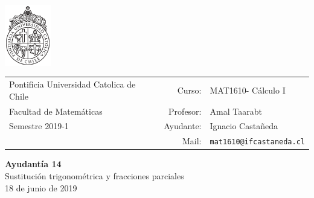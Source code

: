 \documentclass[12pt]{article}
\makeatletter
\newcommand{\ayudantia}{{\sc Ayudantía 14}}
\newcommand{\tituloayu}{Sustitución trigonométrica y fracciones parciales}
\newcommand{\fecha}{18 de junio de 2019}
\newcommand{\sigla}{MAT1610}
\newcommand{\nombre}{Cálculo I}
\newcommand{\profesor}{Amal Taarabt}
\newcommand{\ano}{2019}
\newcommand{\semestre}{1}
\newcommand{\mail}{mat1610@ifcastaneda.cl}
\makeatother
\begin{document}
\thispagestyle{empty}

\begin{minipage}{2cm}
	\includegraphics[width=2cm]{../../../../img/logo.pdf}
	\vspace{0.5cm}
\end{minipage}
\begin{minipage}{\linewidth}
	\begin{tabular}{lrl}
		{\scriptsize\sc Pontificia Universidad Catolica de Chile} & \hspace*{0.7in}Curso: &
		\sigla  - \nombre\\
		{\sc Facultad de Matemáticas}&
		Profesor: & \profesor \\
		{\sc Semestre \ano-\semestre} & Ayudante: & {Ignacio Castañeda}\\
		& {Mail:} & \texttt{\mail}
	\end{tabular}
\end{minipage}

\vspace{-10mm}
\begin{center}
	{\LARGE\bf \ayudantia}\\
	\vspace{0.1cm}
	{\tituloayu}\\
	\vspace{0.1cm}
	\fecha\\
	\vspace{0.4cm}
\end{center}
\end{document}
